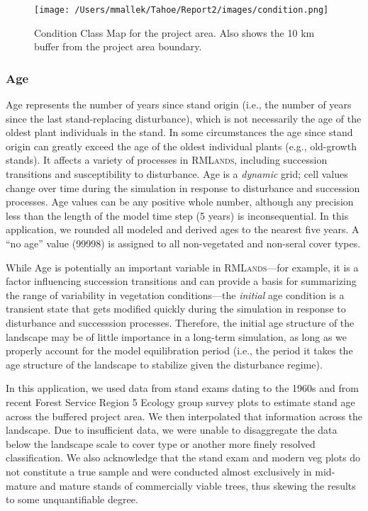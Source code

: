 \begin{figure}[!htbp]
\centering
\texttt{[image: /Users/mmallek/Tahoe/Report2/images/condition.png]}
\caption{Condition Class Map for the project area. Also shows the 10 km buffer from the project area boundary.} 
\label{conditionmap}
\end{figure}

\subsubsection{Age}
Age represents the number of years since stand origin (i.e., the number of years since the last stand-replacing disturbance), which is not necessarily the age of the oldest plant individuals in the stand. In some circumstances the age since stand origin can greatly exceed the age of the oldest individual plants (e.g., old-growth stands). It affects a variety of processes in \textsc{RMLands}, including succession transitions and susceptibility to disturbance. Age is a \emph{dynamic} grid; cell values change over time during the simulation in response to disturbance and succession processes. Age values can be any positive whole number, although any precision less than the length of the model time step (5 years) is inconsequential. In this application, we rounded all modeled and derived ages to the nearest five years. A ``no age'' value (99998) is assigned to all non-vegetated and non-seral cover types.

While Age is potentially an important variable in \textsc{RMLands}---for example, it is a factor influencing succession transitions and can provide a basis for summarizing the range of variability in vegetation conditions---the \emph{initial} age condition is a transient state that gets modified quickly during the simulation in response to disturbance and successsion processes. Therefore, the initial age structure of the landscape may be of little importance in a long-term simulation, as long as we properly account for the model equilibration period (i.e., the period it takes the age structure of the landscape to stabilize given the disturbance regime).

In this application, we used data from stand exams dating to the 1960s and from recent Forest Service Region 5 Ecology group survey plots to estimate stand age across the buffered project area. We then interpolated that information across the landscape. Due to insufficient data, we were unable to disaggregate the data below the landscape scale to cover type or another more finely resolved classification. We also acknowledge that the stand exam and modern veg plots do not constitute a true sample and were conducted almost exclusively in mid-mature and mature stands of commercially viable trees, thus skewing the results to some unquantifiable degree.

